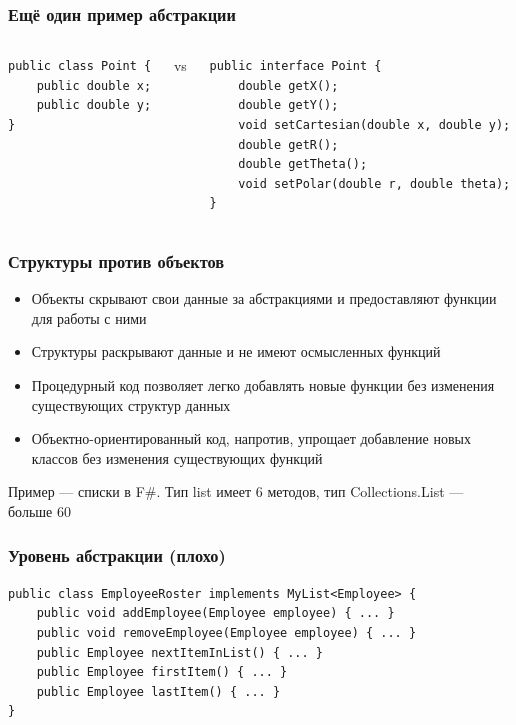 \documentclass[xetex,mathserif,serif]{beamer}
\begin{document}
	\begin{frame}[fragile]
		\frametitle{Ещё один пример абстракции}
		\begin{columns}
			\begin{column}{0.32\textwidth}
				\begin{verbatim}
public class Point {
    public double x;
    public double y;
}
				\end{verbatim}
			\end{column}
			\begin{column}{0.05\textwidth}
				vs
			\end{column}
			\begin{column}{0.6\textwidth}
				\begin{verbatim}
public interface Point {
    double getX();
    double getY();
    void setCartesian(double x, double y);
    double getR();
    double getTheta();
    void setPolar(double r, double theta);
}
				\end{verbatim}
			\end{column}
		\end{columns}
	\end{frame}

	\begin{frame}
		\frametitle{Структуры против объектов}
		\begin{itemize}
			\item Объекты скрывают свои данные за абстракциями и предоставляют функции для работы с ними
			\item Структуры раскрывают данные и не имеют осмысленных функций
		\end{itemize}
		\vspace{3mm}
		\begin{itemize}
			\item Процедурный код позволяет легко добавлять новые функции без изменения существующих структур данных
			\item Объектно-ориентированный код, напротив, упрощает добавление новых классов без изменения существующих функций
		\end{itemize}
		\vspace{3mm}
		Пример --- списки в F\#. Тип list имеет 6 методов, тип Collections.List --- больше 60
	\end{frame}

	\begin{frame}[fragile]
		\frametitle{Уровень абстракции (плохо)}
		\begin{verbatim}
public class EmployeeRoster implements MyList<Employee> {
    public void addEmployee(Employee employee) { ... }
    public void removeEmployee(Employee employee) { ... }
    public Employee nextItemInList() { ... }
    public Employee firstItem() { ... }
    public Employee lastItem() { ... }
}
		\end{verbatim}
	\end{frame}
\end{document}
